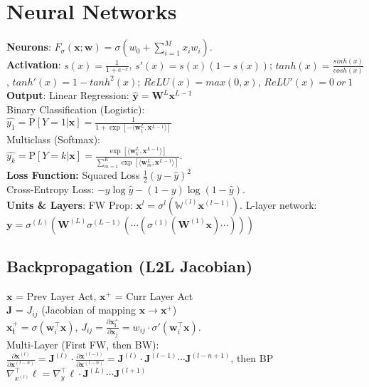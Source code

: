 \section{Neural Networks}
\textbf{Neurons}: $F_\sigma(\mathbf{x};\mathbf{w}) = \sigma(w_0 + \sum_{i=1}^M{x_iw_i})$.\\
\textbf{Activation}: $s(x)=\frac{1}{1+e^{-x}}$, $s'(x)=s(x)(1-s(x))$; $tanh(x) = \tfrac{sinh(x)}{cosh(x)}$, $tanh'(x) = 1 - tanh^2(x)$;  $ReLU(x) = max(0, x)$, $ReLU'(x) = 0\  or\  1$\\
\textbf{Output}: Linear Regression: $\hat{\mathbf{y}} = \mathbf{W}^L\mathbf{x}^{L-1}$\\
Binary Classification (Logistic):\\
$\hat{y_1} = \text{P}[Y=1|\mathbf{x}] = \frac{1}{1 + \exp[-\langle \mathbf{w}_1^L,\mathbf{x}^{L-1}\rangle]}$\\
Multiclass (Softmax):\\
$\hat{y_k} = \text{P}[Y=k|\mathbf{x}]= \frac{\exp[\langle \mathbf{w}_k^L,\mathbf{x}^{L-1}\rangle]}{\sum_{m=1}^{K}{\exp[\langle \mathbf{w}_m^L, \mathbf{x}^{L-1}\rangle]}}$.\\
\textbf{Loss Function:} Squared Loss $\frac{1}{2}(y - \hat{y})^2$\\
Cross-Entropy Loss: $-y \log \hat{y} - (1-y)\log(1-\hat{y})$.\\
\textbf{Units \& Layers}: FW Prop: $\mathbf{x}^{l} = \sigma^{l}\left(\mathbb{W}^{\left(l\right)}\mathbf{x}^{\left(l-1\right)}\right)$. L-layer network: $\mathbf{y}=\sigma^{\left(L\right)}\left(\mathbf{W}^{(L)}\sigma^{(L-1)}\left(\cdots\left(\sigma^{(1)}\left(\mathbf{W}^{(1)}\mathbf{x}\right)\cdots\right)\right)\right)$

\subsection*{Backpropagation (L2L Jacobian)}
$\mathbf{x}$ = Prev Layer Act, $\mathbf{x^+}$ = Curr Layer Act\\$\mathbf{J}$ = $J_{ij}$ (Jacobian of mapping $\mathbf{x}\rightarrow\mathbf{x^+}$)\\ $\mathbf{x_i^+} = \sigma(\mathbf{w}_i^\top\mathbf{x})$, $J_{ij} = \frac{\partial \mathbf{x_i^+}}{\partial \mathbf{x}_j} = w_{ij}\cdot\sigma'(\mathbf{w}_i^\top\mathbf{x})$.\\
Multi-Layer (First FW, then BW):\\
$\frac{\partial\mathbf{x}^{(l)}}{\partial\mathbf{x}^{(l-n)}} = \mathbf{J}^{(l)}\cdot\frac{\partial\mathbf{x}^{(l-1)}}{\partial\mathbf{x}^{(l-n)}}=\mathbf{J}^{(l)}\cdot\mathbf{J}^{(l-1)}\cdots\mathbf{J}^{(l-n+1)}$, then BP $ \nabla_{x^{(l)}}^\top\ell=\nabla_{y}^\top\ell\cdot\mathbf{J}^{(L)}\cdots\mathbf{J}^{(l+1)}$

